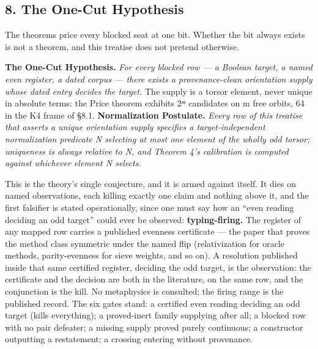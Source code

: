 \documentclass[10pt]{article}
\renewcommand{\_}{\origunderscore\allowbreak}
\begin{document}
\hypertarget{the-one-cut-hypothesis}{%
\subsection{8. The One-Cut Hypothesis}\label{the-one-cut-hypothesis}}

The theorems price every blocked seat at one bit. Whether the bit always
exists is not a theorem, and this treatise does not pretend otherwise.

\textbf{The One-Cut Hypothesis.} \emph{For every blocked row --- a
Boolean target, a named even register, a dated corpus --- there exists a
provenance-clean orientation supply whose dated entry decides the
target.} The supply is a torsor element, never unique in absolute terms:
the Price theorem exhibits 2ᵐ candidates on m free orbits, 64 in the K4
frame of §8.1. \textbf{Normalization Postulate.} \emph{Every row of this
treatise that asserts a unique orientation supply specifies a
target-independent normalization predicate N selecting at most one
element of the wholly odd torsor; uniqueness is always relative to N,
and Theorem 4's calibration is computed against whichever element N
selects.}

This is the theory's single conjecture, and it is armed against itself.
It dies on named observations, each killing exactly one claim and
nothing above it, and the first falsifier is stated operationally, since
one must say how an ``even reading deciding an odd target'' could ever
be observed: \textbf{typing-firing.} The register of any mapped row
carries a published evenness certificate --- the paper that proves the
method class symmetric under the named flip (relativization for oracle
methods, parity-evenness for sieve weights, and so on). A resolution
published inside that same certified register, deciding the odd target,
is the observation: the certificate and the decision are both in the
literature, on the same row, and the conjunction is the kill. No
metaphysics is consulted; the firing range is the published record. The
six gates stand: a certified even reading deciding an odd target (kills
everything); a proved-inert family supplying after all; a blocked row
with no pair defeater; a missing supply proved purely continuous; a
constructor outputting a restatement; a crossing entering without
provenance.
\end{document}
